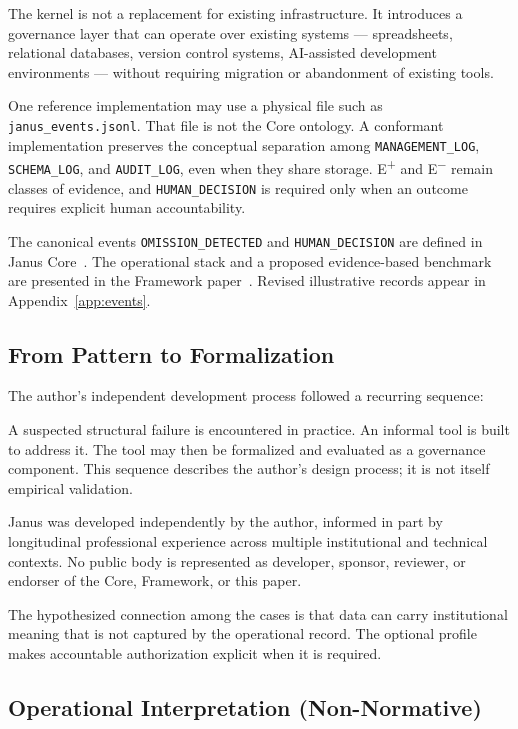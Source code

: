 \documentclass[conference]{IEEEtran}
\begin{document}
The kernel is not a replacement for existing infrastructure. It introduces a governance layer that can operate over existing systems --- spreadsheets, relational databases, version control systems, AI-assisted development environments --- without requiring migration or abandonment of existing tools.

One reference implementation may use a physical file such as
\texttt{janus\_events.jsonl}. That file is not the Core ontology. A conformant
implementation preserves the conceptual separation among
\texttt{MANAGEMENT\_LOG}, \texttt{SCHEMA\_LOG}, and \texttt{AUDIT\_LOG}, even
when they share storage. E\textsuperscript{+} and E\textsuperscript{$-$} remain
classes of evidence, and \texttt{HUMAN\_DECISION} is required only when an
outcome requires explicit human accountability.

The canonical events \texttt{OMISSION\_DETECTED} and
\texttt{HUMAN\_DECISION} are defined in Janus Core~\cite{sanchez_core}. The
operational stack and a proposed evidence-based benchmark are presented in the
Framework paper~\cite{sanchez_framework}. Revised illustrative records appear
in Appendix~\ref{app:events}.

\subsection{From Pattern to Formalization}

The author's independent development process followed a recurring sequence:

A suspected structural failure is encountered in practice. An informal tool is
built to address it. The tool may then be formalized and evaluated as a
governance component. This sequence describes the author's design process; it is
not itself empirical validation.

Janus was developed independently by the author, informed in part by
longitudinal professional experience across multiple institutional and technical
contexts. No public body is represented as developer, sponsor, reviewer, or
endorser of the Core, Framework, or this paper.

The hypothesized connection among the cases is that data can carry institutional
meaning that is not captured by the operational record. The optional profile
makes accountable authorization explicit when it is required.

\subsection{Operational Interpretation (Non-Normative)}
\label{sec:opinterp}
\end{document}
